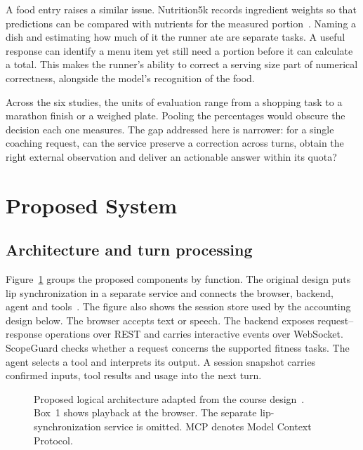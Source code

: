 \documentclass[conference]{IEEEtran}
\begin{document}
A food entry raises a similar issue. Nutrition5k records ingredient weights so that predictions can be compared with nutrients for the measured portion~\cite{nutri}. Naming a dish and estimating how much of it the runner ate are separate tasks. A useful response can identify a menu item yet still need a portion before it can calculate a total. This makes the runner's ability to correct a serving size part of numerical correctness, alongside the model's recognition of the food.

Across the six studies, the units of evaluation range from a shopping task to a marathon finish or a weighed plate. Pooling the percentages would obscure the decision each one measures. The gap addressed here is narrower: for a single coaching request, can the service preserve a correction across turns, obtain the right external observation and deliver an actionable answer within its quota?

\section{Proposed System}
\subsection{Architecture and turn processing}
Figure~\ref{fig:arch} groups the proposed components by function. The original design puts lip synchronization in a separate service and connects the browser, backend, agent and tools~\cite[pp.~2--3]{proposal}. The figure also shows the session store used by the accounting design below. The browser accepts text or speech. The backend exposes request--response operations over REST and carries interactive events over WebSocket. ScopeGuard checks whether a request concerns the supported fitness tasks. The agent selects a tool and interprets its output. A session snapshot carries confirmed inputs, tool results and usage into the next turn.

\begin{figure}[htbp]\centering
{}
\caption{Proposed logical architecture adapted from the course design~\cite{proposal}. Box~1 shows playback at the browser. The separate lip-synchronization service is omitted. MCP denotes Model Context Protocol.}\label{fig:arch}
\end{figure}
\end{document}
